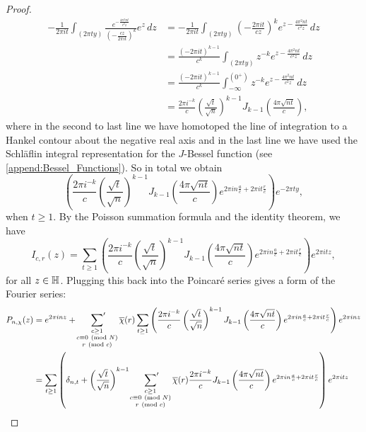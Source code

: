\begin{proof}
      \begin{align*}
        -\frac{1}{2\pi it}\int_{(2\pi ty)}\frac{e^{-\frac{4\pi^{2}nt}{c^{2}z}}}{\left(-\frac{cz}{2\pi it}\right)^{k}}e^{z}\,dz &= -\frac{1}{2\pi it}\int_{(2\pi ty)}\left(-\frac{2\pi it}{cz}\right)^{k}e^{z-\frac{4\pi^{2}nt}{c^{2}z}}\,dz \\
        &= \frac{(-2\pi it)^{k-1}}{c^{k}}\int_{(2\pi ty)}z^{-k}e^{z-\frac{4\pi^{2}nt}{c^{2}z}}\,dz \\
        &= \frac{(-2\pi it)^{k-1}}{c^{k}}\int_{-\infty}^{(0^{+})}z^{-k}e^{z-\frac{4\pi^{2}nt}{c^{2}z}}\,dz \\
        &= \frac{2\pi i^{-k}}{c}\left(\frac{\sqrt{t}}{\sqrt{n}}\right)^{k-1}J_{k-1}\left(\frac{4\pi\sqrt{nt}}{c}\right),
      \end{align*}
      where in the second to last line we have homotoped the line of integration to a Hankel contour about the negative real axis and in the last line we have used the Schl\"aflin integral representation for the $J$-Bessel function (see \cref{append:Bessel_Functions}). So in total we obtain
      \[
        \left(\frac{2\pi i^{-k}}{c}\left(\frac{\sqrt{t}}{\sqrt{n}}\right)^{k-1}J_{k-1}\left(\frac{4\pi\sqrt{nt}}{c}\right)e^{2\pi in\frac{a}{c}+2\pi it\frac{r}{c}}\right)e^{-2\pi ty},
      \]
      when $t \ge 1$. By the Poisson summation formula and the identity theorem, we have
      \[
        I_{c,r}(z) = \sum_{t \ge 1}\left(\frac{2\pi i^{-k}}{c}\left(\frac{\sqrt{t}}{\sqrt{n}}\right)^{k-1}J_{k-1}\left(\frac{4\pi\sqrt{nt}}{c}\right)e^{2\pi in\frac{a}{c}+2\pi it\frac{r}{c}}\right)e^{2\pi itz},
      \]
      for all $z \in \mathbb{H}$. Plugging this back into the Poincar\'e series gives a form of the Fourier series:
      \begin{align*}
        P_{n,\chi}(z) &= e^{2\pi inz}+\psum_{\substack{c \ge 1 \\ c \equiv 0 \tmod{N} \\ r \tmod{c}}}\cchi(r)\sum_{t \ge 1}\left(\frac{2\pi i^{-k}}{c}\left(\frac{\sqrt{t}}{\sqrt{n}}\right)^{k-1}J_{k-1}\left(\frac{4\pi\sqrt{nt}}{c}\right)e^{2\pi in\frac{a}{c}+2\pi it\frac{r}{c}}\right)e^{2\pi inz} \\
        &= \sum_{t \ge 1}\left(\d_{n,t}+\left(\frac{\sqrt{t}}{\sqrt{n}}\right)^{k-1}\psum_{\substack{c \ge 1 \\ c \equiv 0 \tmod{N} \\ r \tmod{c}}}\cchi(r)\frac{2\pi i^{-k}}{c}J_{k-1}\left(\frac{4\pi\sqrt{nt}}{c}\right)e^{2\pi in\frac{a}{c}+2\pi it\frac{r}{c}}\right)e^{2\pi itz} \\

\end{align*}
\end{proof}
